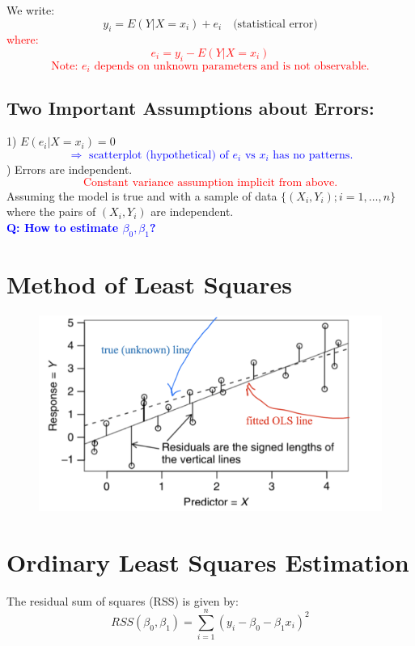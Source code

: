 \documentclass[14pt]{extarticle}
\begin{document}
We write:
\[
y_i = E(Y|X=x_i) + e_i \quad \text{(statistical error)}
\]
\textcolor{red}{where:
\[
e_i = y_i - E(Y|X=x_i)
\]
\[
\text{Note: } e_i \text{ depends on unknown parameters and is not observable.}
\]}

\subsection*{Two Important Assumptions about Errors:}
1) $E(e_i|X=x_i) = 0$ 
\textcolor{blue}{\[
\Rightarrow \text{ scatterplot (hypothetical) of } e_i \text{ vs } x_i \text{ has no patterns.}
\]}
) Errors are independent.
\textcolor{red}{\[
\text{Constant variance assumption implicit from above.}
\]}
\noindent
Assuming the model is true and with a sample of data $\{(X_i, Y_i); i=1, \dots, n\}$ where the pairs of $(X_i, Y_i)$ are independent.\\
\textcolor{blue}{\textbf{Q: How to estimate $\beta_0, \beta_1$?}}\\

\section*{Method of Least Squares}

\begin{figure}[H]
    \centering
    \includegraphics[width=1\textwidth]{fig2.png}
\end{figure}

\section*{Ordinary Least Squares Estimation}

The residual sum of squares (RSS) is given by:
\[
RSS(\beta_0, \beta_1) = \sum_{i=1}^{n} (y_i - \beta_0 - \beta_1 x_i)^2
\]
\end{document}
